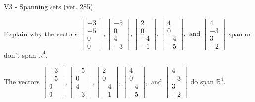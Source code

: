 \begin{exercise}
  \begin{exerciseTitle}V3 - Spanning sets (ver. 285)\end{exerciseTitle}
  \begin{exerciseStatement}
    Explain why the vectors \(\left[\begin{array}{r}
-3 \\
-5 \\
0 \\
0
\end{array}\right] , \left[\begin{array}{r}
-5 \\
0 \\
4 \\
-3
\end{array}\right] , \left[\begin{array}{r}
2 \\
0 \\
-4 \\
-1
\end{array}\right] , \left[\begin{array}{r}
4 \\
0 \\
-4 \\
-5
\end{array}\right] , \text{ and } \left[\begin{array}{r}
4 \\
-3 \\
3 \\
-2
\end{array}\right]\) span or don't span \(\mathbb{R}^4\). 
	


  \end{exerciseStatement}
  \begin{exerciseAnswer}
   The vectors \(\left[\begin{array}{r}
-3 \\
-5 \\
0 \\
0
\end{array}\right] , \left[\begin{array}{r}
-5 \\
0 \\
4 \\
-3
\end{array}\right] , \left[\begin{array}{r}
2 \\
0 \\
-4 \\
-1
\end{array}\right] , \left[\begin{array}{r}
4 \\
0 \\
-4 \\
-5
\end{array}\right] , \text{ and } \left[\begin{array}{r}
4 \\
-3 \\
3 \\
-2
\end{array}\right]\) 
  	 do  
	span \(\mathbb{R}^4\).
  



\end{exerciseAnswer}
\end{exercise}
